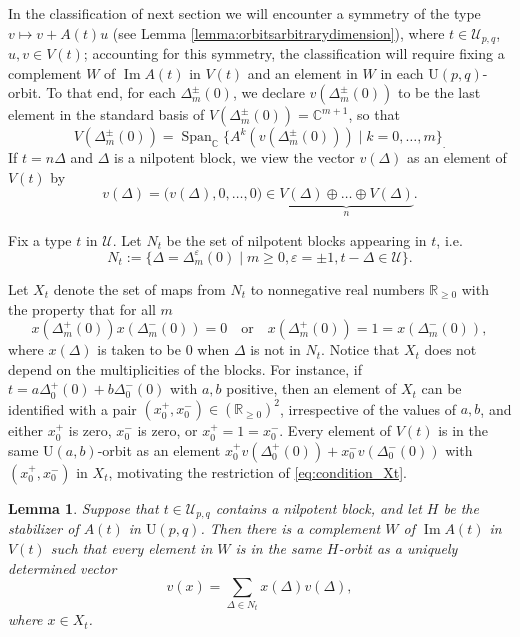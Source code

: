 \documentclass{article}
\newtheorem{lemma}[theorem]{Lemma}
\theoremstyle{definition}
\newcommand{\R}{\mathbb{R}}
\newcommand{\C}{\mathbb{C}}
\renewcommand{\Im}{\operatorname{Im}}
\newcommand{\SpanC}[1]{\operatorname{Span}_\C\{#1\}}
\begin{document}
In the classification of next section we will encounter a symmetry of the type $v\mapsto v+A(t)u$ (see Lemma \ref{lemma:orbitsarbitrarydimension}), where $t\in\mathcal{U}_{p,q}$, $u,v\in V(t)$; accounting for this symmetry, the classification will require fixing a complement $W$ of $\Im A(t)$ in $V(t)$ and an element in $W$ in each $\mathrm{U}(p,q)$-orbit. To that end, for each $\Delta^\pm_m(0)$, we declare $v(\Delta^\pm_m(0))$ to be the last element in the standard basis of $V(\Delta^\pm_m(0))=\C^{m+1}$, so that $$V(\Delta^\pm_m(0))=\SpanC{A^k(v(\Delta^\pm_m(0)))\mid k=0,\dotsc,m}_.$$ If $t=n\Delta$ and $\Delta$ is a nilpotent block, we view the vector $v(\Delta)$ as an element of $V(t)$ by $$v(\Delta)=\bigl(v(\Delta),0, \dotsc, 0\bigr)\in\underbrace{V(\Delta)\oplus \dots \oplus V(\Delta)}_{n}.$$

Fix a type $t$ in $\mathcal{U}$. Let $N_t$ be the set of nilpotent blocks appearing in $t$, i.e.\ $$N_t:=\{\Delta=\Delta^{\varepsilon}_m(0)\mid m\geq0, \varepsilon=\pm1, t-\Delta\in\mathcal{U}\}.$$

Let $X_t$ denote the set of maps from $N_t$ to nonnegative real numbers $\R_{\geq0}$ with the property that for all $m$ \begin{equation}\label{eq:condition_Xt}
    x(\Delta_m^+(0))x(\Delta_m^-(0))=0\quad\text{or}\quad x(\Delta_m^+(0))=1=x(\Delta_m^-(0)),
\end{equation} where $x(\Delta)$ is taken to be $0$ when $\Delta$ is not in $N_t$. Notice that $X_t$ does not depend on the multiplicities of the blocks. For instance, if $t=a\Delta_0^+(0)+b\Delta_0^-(0)$ with $a,b$ positive, then an element of $X_t$ can be identified with a pair $(x_0^+, x_0^-)\in(\R_{\geq0})^2$, irrespective of the values of $a,b$, and either $x_0^+$ is zero, $x_0^-$ is zero, or $x_0^+=1=x_0^-$. Every element of $V(t)$ is in the same $\mathrm{U}(a,b)$-orbit as an element $x_0^+v(\Delta_0^+(0))+x_0^-v(\Delta_0^-(0))$ with $(x_0^+,x_0^-)$ in $X_t$, motivating the restriction of \eqref{eq:condition_Xt}.

\begin{lemma}\label{lemma:parametrizecomplement}
    Suppose that $t\in\mathcal{U}_{p,q}$ contains a nilpotent block, and let $H$ be the stabilizer of $A(t)$ in $\mathrm{U}(p,q)$. Then there is a complement $W$ of $\Im A(t)$ in $V(t)$ such that every element in $W$ is in the same $H$-orbit as a uniquely determined vector \begin{equation}\label{eqn:vofx}
        v(x)=\sum_{\Delta\in N_t} x(\Delta)v(\Delta),
    \end{equation} where $x\in X_t$.
\end{lemma}
\end{document}
